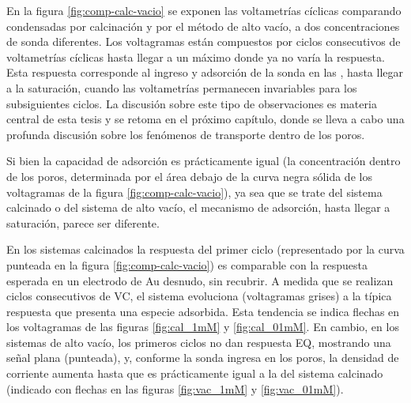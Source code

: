 	  En la figura \ref{fig:comp-calc-vacio} se exponen las voltametrías cíclicas comparando \pdmF\space condensadas por calcinación y por el método de alto vacío, a dos concentraciones de sonda diferentes. Los voltagramas están compuestos por ciclos consecutivos de voltametrías cíclicas hasta llegar a un máximo donde ya no varía la respuesta. Esta respuesta corresponde al ingreso y adsorción de la sonda en las \pdm, hasta llegar a la saturación, cuando las voltametrías permanecen invariables para los subsiguientes ciclos. La discusión sobre este tipo de observaciones  es materia central de esta tesis y se retoma en el próximo capítulo, donde se lleva a cabo una profunda discusión sobre los fenómenos de transporte dentro de los poros.

      Si bien la capacidad de adsorción es prácticamente igual (la concentración dentro de los poros, determinada por el área debajo de la curva negra sólida de los voltagramas de la figura \ref{fig:comp-calc-vacio}), ya sea que se trate del sistema calcinado o del sistema de alto vacío, el mecanismo de adsorción, hasta llegar a saturación, parece ser diferente. 

      En los sistemas calcinados la respuesta del primer ciclo (representado por la curva punteada en la figura \ref{fig:comp-calc-vacio}) es comparable con la respuesta esperada en un electrodo de Au desnudo, sin recubrir. A medida que se realizan ciclos consecutivos de VC, el sistema evoluciona (voltagramas grises) a la típica respuesta que presenta una especie adsorbida. Esta tendencia se indica flechas en los voltagramas de las figuras \ref{fig:cal_1mM} y \ref{fig:cal_01mM}. En cambio, en los sistemas de alto vacío, los primeros ciclos no dan respuesta EQ, mostrando una señal plana (punteada), y, conforme la sonda ingresa en los poros, la densidad de corriente aumenta hasta que es prácticamente igual a la del sistema calcinado (indicado con flechas en las figuras \ref{fig:vac_1mM} y \ref{fig:vac_01mM}). 

